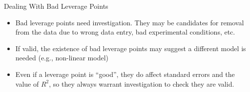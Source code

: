 \documentclass{beamer}
\begin{document}
\begin{frame}{Dealing With Bad Leverage Points}
    \begin{itemize}
        \item Bad leverage points need investigation. They may be candidates for removal from the data due to wrong data entry, bad experimental conditions, etc.
        \item If valid, the existence of bad leverage points may suggest a different model is needed (e.g., non-linear model)
        \item Even if a leverage point is ``good'', they do affect standard errors and the value of $R^2$, so they always warrant investigation to check they are valid.
    \end{itemize}
\end{frame}
\end{document}
